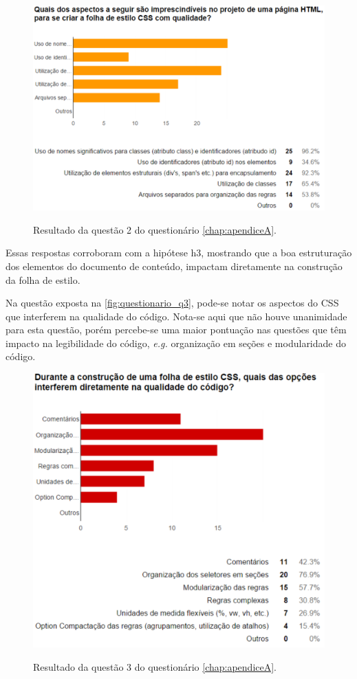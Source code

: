 \begin{figure}[!htb]
	\centering
	\caption{Resultado da questão 2 do questionário \autoref{chap:apendiceA}.}
	\includegraphics[width=1\textwidth]{./04-figuras/questionario_q2}
	\label{fig:questionario_q2}
\end{figure}

Essas respostas corroboram com a hipótese h3, mostrando que a boa estruturação dos elementos do documento de conteúdo, impactam diretamente na construção da folha de estilo.

Na questão exposta na \autoref{fig:questionario_q3}, pode-se notar os aspectos do CSS que interferem na qualidade do código. Nota-se aqui que não houve unanimidade para esta questão, porém percebe-se uma maior pontuação nas questões que têm impacto na legibilidade do código, \textit{e.g.} organização em seções e modularidade do código.

\begin{figure}[!htb]
	\centering
	\caption{Resultado da questão 3 do questionário \autoref{chap:apendiceA}.}
	\includegraphics[width=1\textwidth]{./04-figuras/questionario_q3}
	\label{fig:questionario_q3}
\end{figure}

